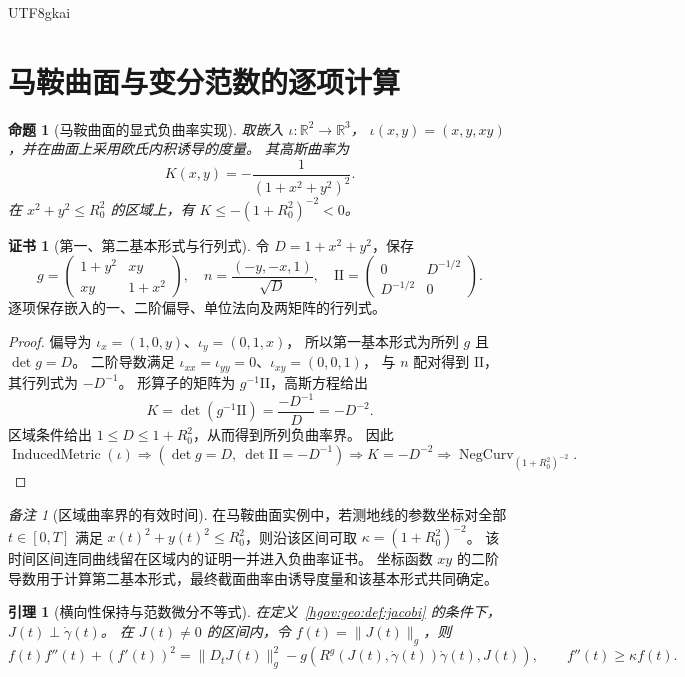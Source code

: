 \documentclass[12pt,a4paper,openany,notitlepage]{report}
\theoremstyle{plain}
\newtheorem{lemma}[theorem]{引理}
\newtheorem{proposition}[theorem]{命题}
\theoremstyle{definition}
\newtheorem*{certificate}{证书}
\theoremstyle{remark}
\newtheorem{remark}[theorem]{备注}
\begin{document}
\begin{CJK*}{UTF8}{gkai}
\section{马鞍曲面与变分范数的逐项计算}
\label{hgov:geo:observation}

\begin{proposition}[马鞍曲面的显式负曲率实现]
\label{hgov:geo:prop:saddle}
取嵌入 $\iota:\mathbb R^2\to\mathbb R^3$，
$\iota(x,y)=(x,y,xy)$，并在曲面上采用欧氏内积诱导的度量。
其高斯曲率为
\[
K(x,y)=-\frac{1}{(1+x^2+y^2)^2}.
\]
在 $x^2+y^2\le R_0^2$ 的区域上，有
$K\le-(1+R_0^2)^{-2}<0$。
\end{proposition}
\begin{certificate}[第一、第二基本形式与行列式]
令 $D=1+x^2+y^2$，保存
\[
g=\begin{pmatrix}1+y^2&xy\\xy&1+x^2\end{pmatrix},
\quad
n=\frac{(-y,-x,1)}{\sqrt D},
\quad
\mathrm{II}=\begin{pmatrix}0&D^{-1/2}\\D^{-1/2}&0\end{pmatrix}.
\]
逐项保存嵌入的一、二阶偏导、单位法向及两矩阵的行列式。
\end{certificate}
\begin{proof}
偏导为 $\iota_x=(1,0,y)$、$\iota_y=(0,1,x)$，
所以第一基本形式为所列 $g$ 且 $\det g=D$。
二阶导数满足 $\iota_{xx}=\iota_{yy}=0$、$\iota_{xy}=(0,0,1)$，
与 $n$ 配对得到 $\mathrm{II}$，其行列式为 $-D^{-1}$。
形算子的矩阵为 $g^{-1}\mathrm{II}$，高斯方程给出
\[
K=\det(g^{-1}\mathrm{II})
=\frac{-D^{-1}}{D}=-D^{-2}.
\]
区域条件给出 $1\le D\le1+R_0^2$，从而得到所列负曲率界。
因此
\[
\operatorname{InducedMetric}(\iota)
\Rightarrow(\det g=D,\ \det\mathrm{II}=-D^{-1})
\Rightarrow K=-D^{-2}
\Rightarrow\operatorname{NegCurv}_{(1+R_0^2)^{-2}} .
\]
\end{proof}

\begin{remark}[区域曲率界的有效时间]
在马鞍曲面实例中，若测地线的参数坐标对全部 $t\in[0,T]$ 满足
$x(t)^2+y(t)^2\le R_0^2$，则沿该区间可取
$\kappa=(1+R_0^2)^{-2}$。
该时间区间连同曲线留在区域内的证明一并进入负曲率证书。
坐标函数 $xy$ 的二阶导数用于计算第二基本形式，最终截面曲率由诱导度量和该基本形式共同确定。
\end{remark}

\begin{lemma}[横向性保持与范数微分不等式]
\label{hgov:geo:lem:norm}
在定义~\ref{hgov:geo:def:jacobi} 的条件下，$J(t)\perp\dot\gamma(t)$。
在 $J(t)\ne0$ 的区间内，令 $f(t)=\lVert J(t)\rVert_g$，则
\begin{equation}
\label{hgov:geo:eq:norm-inequality}
f(t)f''(t)+(f'(t))^2
=\lVert D_tJ(t)\rVert_g^2
-g(R^g(J(t),\dot\gamma(t))\dot\gamma(t),J(t)),
\qquad f''(t)\ge\kappa f(t).
\end{equation}
\end{lemma}


\end{CJK*}
\end{document}

